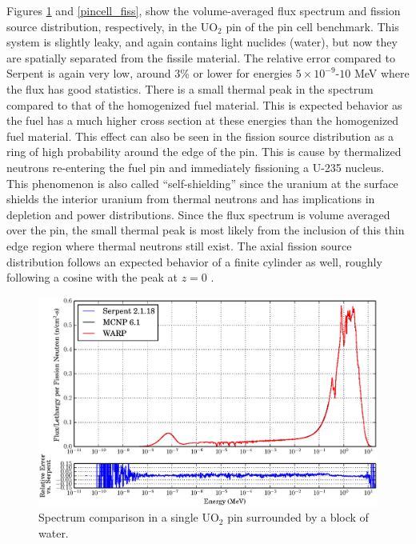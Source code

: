 Figures \ref{pincell_spec} and \ref{pincell_fiss}, show the volume-averaged flux spectrum and fission source distribution, respectively, in the UO$_2$ pin of the pin cell benchmark.  This system is slightly leaky, and again contains light nuclides (water), but now they are spatially separated from the fissile material.  The relative error compared to Serpent is again very low, around 3\% or lower for energies $5\times10^{-9}$-$10$ MeV where the flux has good statistics.  There is a small thermal peak in the spectrum compared to that of the homogenized fuel material.  This is expected behavior as the fuel has a much higher cross section at these energies than the homogenized fuel material.  This effect can also be seen in the fission source distribution as a ring of high probability around the edge of the pin.  This is cause by thermalized neutrons re-entering the fuel pin and immediately fissioning a U-235 nucleus.  This phenomenon is also called ``self-shielding'' since the uranium at the surface shields the interior uranium from thermal neutrons and has implications in depletion and power distributions.  Since the flux spectrum is volume averaged over the pin, the small thermal peak is most likely from the inclusion of this thin edge region where thermal neutrons still exist.  The axial fission source distribution follows an expected behavior of a finite cylinder as well, roughly following a cosine with the peak at $z=0$ \cite{duderstadt}.

 
\begin{figure}[h!] 
\centering
\includegraphics[width=\textwidth,trim= 1cm 0cm 1cm 0cm]{graphics/finalresults/pincell_spec-6.eps}
\caption{Spectrum comparison in a single UO$_2$ pin surrounded by a block of water. \label{pincell_spec} }
\end{figure}

